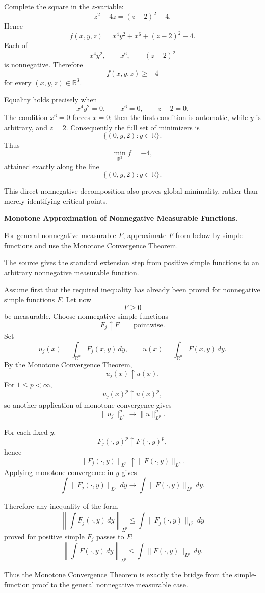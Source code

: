 \begin{solution}
Complete the square in the \(z\)-variable:
\[
z^2-4z=(z-2)^2-4.
\]
Hence
\[
f(x,y,z)
=
x^4y^2+x^6+(z-2)^2-4.
\]
Each of
\[
x^4y^2,\qquad x^6,\qquad (z-2)^2
\]
is nonnegative. Therefore
\[
f(x,y,z)\ge -4
\]
for every \((x,y,z)\in\mathbb R^3\).

Equality holds precisely when
\[
x^4y^2=0,\qquad x^6=0,\qquad z-2=0.
\]
The condition \(x^6=0\) forces \(x=0\); then the first condition is automatic,
while \(y\) is arbitrary, and \(z=2\). Consequently the full set of minimizers is
\[
\{(0,y,2):y\in\mathbb R\}.
\]
Thus
\[
\boxed{\min_{\mathbb R^3} f=-4,}
\]
attained exactly along the line
\[
\boxed{\{(0,y,2):y\in\mathbb R\}.}
\]

This direct nonnegative decomposition also proves global minimality, rather than
merely identifying critical points.
\end{solution}

\begin{problem}[CP-II-0228]
\label{prob:cp-ii-0228}
\textbf{Monotone Approximation of Nonnegative Measurable Functions.}

\hspace*{1.5em}For general nonnegative measurable $F$, approximate $F$ from below
	by simple functions and use the Monotone Convergence Theorem.
\end{problem}

\begin{solution}
The source gives the standard extension step from positive simple functions to an arbitrary
nonnegative measurable function.

Assume first that the required inequality has already been proved for nonnegative simple
functions \(F\). Let now
\[
F\ge0
\]
be measurable. Choose nonnegative simple functions
\[
F_j\uparrow F
\qquad\text{pointwise}.
\]
Set
\[
u_j(x)=\int_{\mathbb R^n}F_j(x,y)\,dy,
\qquad
u(x)=\int_{\mathbb R^n}F(x,y)\,dy.
\]
By the Monotone Convergence Theorem,
\[
u_j(x)\uparrow u(x).
\]
For \(1\le p<\infty\),
\[
u_j(x)^p\uparrow u(x)^p,
\]
so another application of monotone convergence gives
\[
\|u_j\|_{L^p}^p
\longrightarrow
\|u\|_{L^p}^p.
\]

For each fixed \(y\),
\[
F_j(\cdot,y)^p\uparrow F(\cdot,y)^p,
\]
hence
\[
\|F_j(\cdot,y)\|_{L^p}
\uparrow
\|F(\cdot,y)\|_{L^p}.
\]
Applying monotone convergence in \(y\) gives
\[
\int
\|F_j(\cdot,y)\|_{L^p}\,dy
\longrightarrow
\int
\|F(\cdot,y)\|_{L^p}\,dy.
\]

Therefore any inequality of the form
\[
\left\|
\int F_j(\cdot,y)\,dy
\right\|_{L^p}
\le
\int
\|F_j(\cdot,y)\|_{L^p}\,dy
\]
proved for positive simple \(F_j\) passes to \(F\):
\[
\boxed{
\left\|
\int F(\cdot,y)\,dy
\right\|_{L^p}
\le
\int
\|F(\cdot,y)\|_{L^p}\,dy.
}
\]

Thus the Monotone Convergence Theorem is exactly the bridge from the simple-function proof
to the general nonnegative measurable case.
\end{solution}


